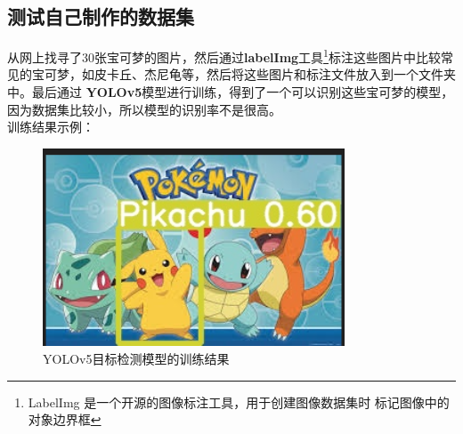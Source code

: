 \documentclass{nwputhesis}
\begin{document}
\subsection{测试自己制作的数据集}
从网上找寻了30张宝可梦的图片，然后通过\textbf{labelImg}工具\footnote{LabelImg 是一个开源的图像标注工具，用于创建图像数据集时
标记图像中的对象边界框}标注这些图片中比较常见的宝可梦，如皮卡丘、杰尼龟等，然后将这些图片和标注文件放入到一个文件夹中。最后通过
\textbf{YOLOv5}模型进行训练，得到了一个可以识别这些宝可梦的模型，因为数据集比较小，所以模型的识别率不是很高。
\\
\indent 训练结果示例：
\begin{figure}[H]
    \centering
    \includegraphics[width=0.8\textwidth]{picture/3.png}
    \caption{YOLOv5目标检测模型的训练结果}
\end{figure}
\makespace
\end{document}
